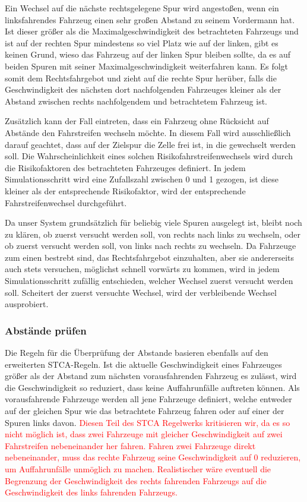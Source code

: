 \documentclass[11pt, a4paper]{article}
\begin{document}
Ein Wechsel auf die nächste rechtsgelegene Spur wird angestoßen, wenn ein linksfahrendes Fahrzeug einen sehr großen Abstand zu seinem Vordermann hat. Ist dieser größer als die Maximalgeschwindigkeit des betrachteten Fahrzeugs und ist auf der rechten Spur mindestens so viel Platz wie auf der linken, gibt es keinen Grund, wieso das Fahrzeug auf der linken Spur bleiben sollte, da es auf beiden Spuren mit seiner Maximalgeschwindigkeit weiterfahren kann. Es folgt somit dem Rechtsfahrgebot und zieht auf die rechte Spur herüber, falls die Geschwindigkeit des nächsten dort nachfolgenden Fahrzeuges kleiner als der Abstand zwischen rechts nachfolgendem und betrachtetem Fahrzeug ist.

Zusätzlich kann der Fall eintreten, dass ein Fahrzeug ohne Rücksicht auf Abstände den Fahrstreifen wechseln möchte. In diesem Fall wird ausschließlich darauf geachtet, dass auf der Zielspur die Zelle frei ist, in die gewechselt werden soll. Die Wahrscheinlichkeit eines solchen Risikofahrstreifenwechsels wird durch die Risikofaktoren des betrachteten Fahrzeuges definiert. In jedem Simulationsschritt wird eine Zufallszahl zwischen 0 und 1 gezogen, ist diese kleiner als der entsprechende Risikofaktor, wird der entsprechende Fahrstreifenwechsel durchgeführt.

Da unser System grundsätzlich für beliebig viele Spuren ausgelegt ist, bleibt noch zu klären, ob zuerst versucht werden soll, von rechts nach links zu wechseln, oder ob zuerst versucht werden soll, von links nach rechts zu wechseln. Da Fahrzeuge zum einen bestrebt sind, das Rechtsfahrgebot einzuhalten, aber sie andererseits auch stets versuchen, möglichst schnell vorwärts zu kommen, wird in jedem Simulationsschritt zufällig entschieden, welcher Wechsel zuerst versucht werden soll. Scheitert der zuerst versuchte Wechsel, wird der verbleibende Wechsel ausprobiert.

\subsubsection{Abstände prüfen}
\label{subsubsec:abstaendePruefen}

Die Regeln für die Überprüfung der Abstande basieren ebenfalls auf den erweiterten STCA-Regeln. Ist die aktuelle Geschwindigkeit eines Fahrzeuges größer als der Abstand zum nächsten vorausfahrenden Fahrzeug es zulässt, wird die Geschwindigkeit so reduziert, dass keine Auffahrunfälle auftreten können. Als vorausfahrende Fahrzeuge werden all jene Fahrzeuge definiert, welche entweder auf der gleichen Spur wie das betrachtete Fahrzeug fahren oder auf einer der Spuren links davon. \textcolor{red}{Diesen Teil des STCA Regelwerks kritisieren wir, da es so nicht möglich ist, dass zwei Fahrzeuge mit gleicher Geschwindigkeit auf zwei Fahrstreifen nebeneinander her fahren. Fahren zwei Fahrzeuge direkt nebeneinander, muss das rechte Fahrzeug seine Geschwindigkeit auf 0 reduzieren, um Auffahrunfälle unmöglich zu machen. Realistischer wäre eventuell die Begrenzung der Geschwindigkeit des rechts fahrenden Fahrzeugs auf die Geschwindigkeit des links fahrenden Fahrzeugs.}
\end{document}
